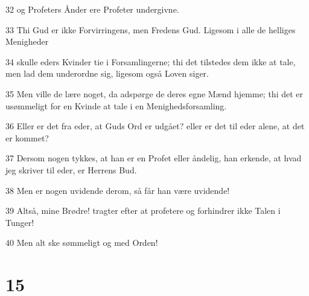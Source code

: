 \par 32 og Profeters Ånder ere Profeter undergivne.
\par 33 Thi Gud er ikke Forvirringens, men Fredens Gud. Ligesom i alle de helliges Menigheder
\par 34 skulle eders Kvinder tie i Forsamlingerne; thi det tilstedes dem ikke at tale, men lad dem underordne sig, ligesom også Loven siger.
\par 35 Men ville de lære noget, da adspørge de deres egne Mænd hjemme; thi det er usømmeligt for en Kvinde at tale i en Menighedsforsamling.
\par 36 Eller er det fra eder, at Guds Ord er udgået? eller er det til eder alene, at det er kommet?
\par 37 Dersom nogen tykkes, at han er en Profet eller åndelig, han erkende, at hvad jeg skriver til eder, er Herrens Bud.
\par 38 Men er nogen uvidende derom, så får han være uvidende!
\par 39 Altså, mine Brødre! tragter efter at profetere og forhindrer ikke Talen i Tunger!
\par 40 Men alt ske sømmeligt og med Orden!

\chapter{15}

